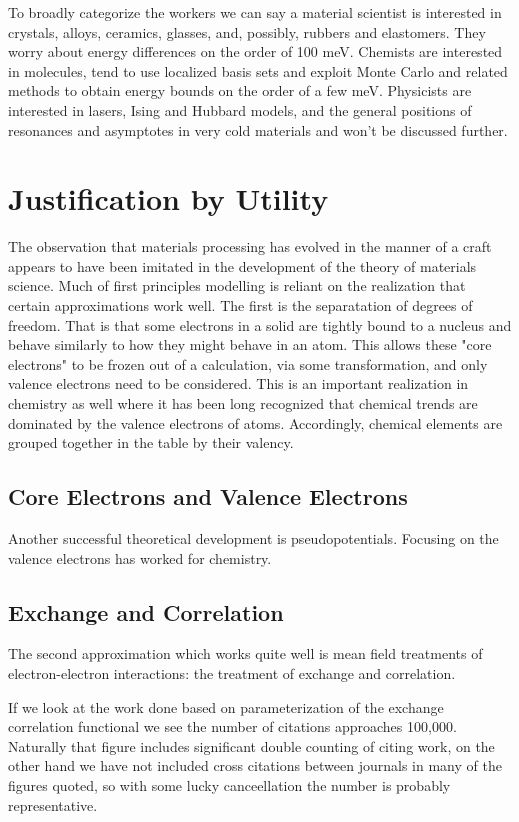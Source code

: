 To broadly categorize the workers we can say a material scientist 
is interested in crystals, alloys, ceramics, glasses, and, possibly, rubbers and elastomers. They
worry about energy differences on the order of 100 meV. Chemists are interested in molecules, 
tend to use localized basis sets and exploit Monte Carlo and related methods to obtain energy 
bounds on the order of a few meV. Physicists are interested in lasers, Ising and Hubbard models, and the 
general positions of resonances and asymptotes in very cold materials and won't be discussed further.

\section{Justification by Utility}
The observation that materials processing has evolved in the manner 
of a craft appears to have been imitated in the development of the 
theory of materials science. Much of first principles modelling is reliant on
the realization that certain approximations work well. The first is 
the separatation of degrees of freedom. That is that some electrons in a solid are
tightly bound to a nucleus and behave similarly to how they might behave in an atom.
This allows these "core electrons" to be frozen out of a calculation, via some transformation,
and only valence electrons need to be considered. This is an important realization in
chemistry as well where it has been long recognized that chemical trends are dominated by
the valence electrons of atoms. Accordingly, chemical elements are grouped together in the table 
by their valency. 

\subsection{Core Electrons and Valence Electrons}
Another successful theoretical development is pseudopotentials. Focusing on the valence electrons 
has worked for chemistry.

\subsection{Exchange and Correlation}
The second approximation which works quite well is mean field treatments of 
electron-electron interactions: the treatment of exchange and correlation. 

If we look at the work done based on parameterization of the exchange correlation functional 
we see the number of citations approaches 100,000. Naturally that figure includes significant 
double counting of citing work, on the other hand  we have not included cross citations between journals in many of the 
figures quoted, so with some lucky canceellation the number is probably representative. 

